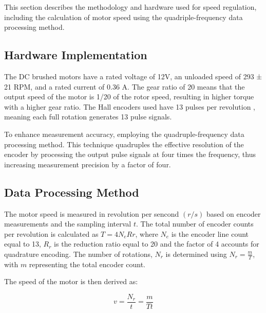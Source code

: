 \documentclass[journal,onecolumn]{IEEEtran}
\begin{document}
This section describes the methodology and hardware used for speed regulation, including the calculation of motor speed using the quadriple-frequency data processing  method.

\subsection{Hardware Implementation}

The DC brushed motors have a rated voltage of 12V, an unloaded speed of 293 ± 21 RPM, and a rated current of 0.36 A. The gear ratio of 20 means that the output speed of the motor is 1/20 of the rotor speed, resulting in higher torque with a higher gear ratio. The Hall encoders used have 13 pulses per revolution , meaning each full rotation generates 13 pulse signals. 

To enhance measurement accuracy, employing the quadruple-frequency data processing method. This technique quadruples the effective resolution of the encoder by processing the output pulse signals at four times the frequency, thus increasing measurement precision by a factor of four.

\subsection{Data Processing Method}

The motor speed is measured in revolution per sencond $(r/s)$ based on encoder measurements and the sampling interval $t$. The total number of encoder counts per revolution is calculated as $ T=4N_{e}R{r} $, where $N_e$ is the encoder line count equal to 13, $R_r$ is the reduction ratio equal to 20 and the factor of 4 accounts for quadrature encoding. The number of rotations, $N_r$ is determined using $N_r = \frac{m}{T}$, with $m$ representing the total encoder count.

The speed of the motor is then derived as:

\begin{equation}
           \label{motor_speed}
           v = \frac{N_r}{t} = \frac{m}{T  t}
\end{equation}





\end{document}
